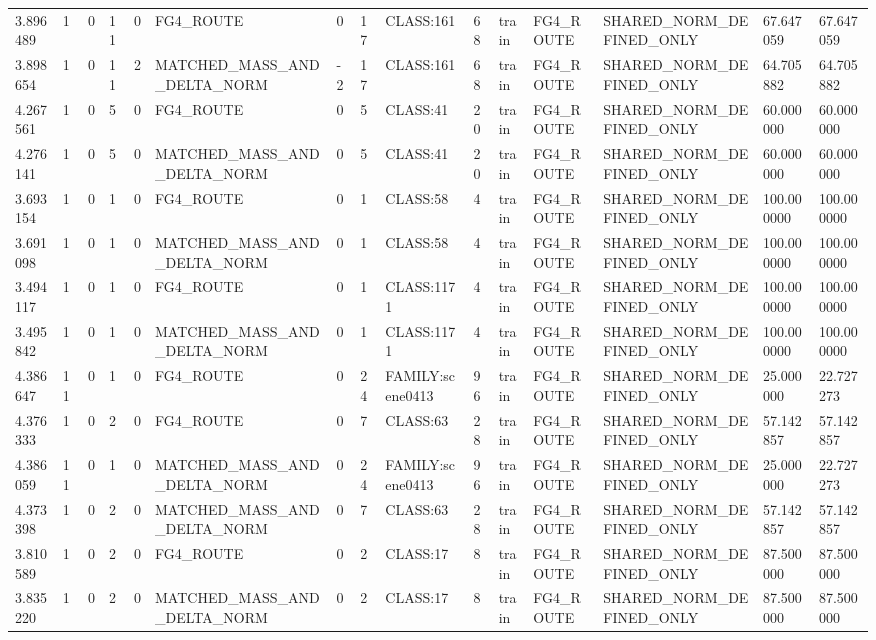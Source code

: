 \begin{tabular}{lllllllllllllll}
3.896489 & 1 & 0 & 11 & 0 & FG4\_ROUTE & 0 & 17 & CLASS:161 & 68 & train & FG4\_ROUTE & SHARED\_NORM\_DEFINED\_ONLY & 67.647059 & 67.647059 \\
3.898654 & 1 & 0 & 11 & 2 & MATCHED\_MASS\_AND\_DELTA\_NORM & -2 & 17 & CLASS:161 & 68 & train & FG4\_ROUTE & SHARED\_NORM\_DEFINED\_ONLY & 64.705882 & 64.705882 \\
4.267561 & 1 & 0 & 5 & 0 & FG4\_ROUTE & 0 & 5 & CLASS:41 & 20 & train & FG4\_ROUTE & SHARED\_NORM\_DEFINED\_ONLY & 60.000000 & 60.000000 \\
4.276141 & 1 & 0 & 5 & 0 & MATCHED\_MASS\_AND\_DELTA\_NORM & 0 & 5 & CLASS:41 & 20 & train & FG4\_ROUTE & SHARED\_NORM\_DEFINED\_ONLY & 60.000000 & 60.000000 \\
3.693154 & 1 & 0 & 1 & 0 & FG4\_ROUTE & 0 & 1 & CLASS:58 & 4 & train & FG4\_ROUTE & SHARED\_NORM\_DEFINED\_ONLY & 100.000000 & 100.000000 \\
3.691098 & 1 & 0 & 1 & 0 & MATCHED\_MASS\_AND\_DELTA\_NORM & 0 & 1 & CLASS:58 & 4 & train & FG4\_ROUTE & SHARED\_NORM\_DEFINED\_ONLY & 100.000000 & 100.000000 \\
3.494117 & 1 & 0 & 1 & 0 & FG4\_ROUTE & 0 & 1 & CLASS:1171 & 4 & train & FG4\_ROUTE & SHARED\_NORM\_DEFINED\_ONLY & 100.000000 & 100.000000 \\
3.495842 & 1 & 0 & 1 & 0 & MATCHED\_MASS\_AND\_DELTA\_NORM & 0 & 1 & CLASS:1171 & 4 & train & FG4\_ROUTE & SHARED\_NORM\_DEFINED\_ONLY & 100.000000 & 100.000000 \\
4.386647 & 11 & 0 & 1 & 0 & FG4\_ROUTE & 0 & 24 & FAMILY:scene0413 & 96 & train & FG4\_ROUTE & SHARED\_NORM\_DEFINED\_ONLY & 25.000000 & 22.727273 \\
4.376333 & 1 & 0 & 2 & 0 & FG4\_ROUTE & 0 & 7 & CLASS:63 & 28 & train & FG4\_ROUTE & SHARED\_NORM\_DEFINED\_ONLY & 57.142857 & 57.142857 \\
4.386059 & 11 & 0 & 1 & 0 & MATCHED\_MASS\_AND\_DELTA\_NORM & 0 & 24 & FAMILY:scene0413 & 96 & train & FG4\_ROUTE & SHARED\_NORM\_DEFINED\_ONLY & 25.000000 & 22.727273 \\
4.373398 & 1 & 0 & 2 & 0 & MATCHED\_MASS\_AND\_DELTA\_NORM & 0 & 7 & CLASS:63 & 28 & train & FG4\_ROUTE & SHARED\_NORM\_DEFINED\_ONLY & 57.142857 & 57.142857 \\
3.810589 & 1 & 0 & 2 & 0 & FG4\_ROUTE & 0 & 2 & CLASS:17 & 8 & train & FG4\_ROUTE & SHARED\_NORM\_DEFINED\_ONLY & 87.500000 & 87.500000 \\
3.835220 & 1 & 0 & 2 & 0 & MATCHED\_MASS\_AND\_DELTA\_NORM & 0 & 2 & CLASS:17 & 8 & train & FG4\_ROUTE & SHARED\_NORM\_DEFINED\_ONLY & 87.500000 & 87.500000 \\

\end{tabular}
